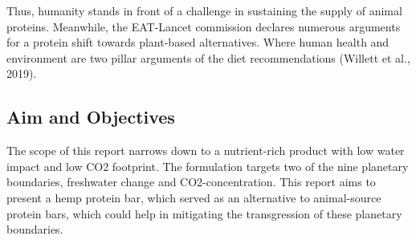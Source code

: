 Thus, humanity stands in front of a challenge in sustaining the supply of animal proteins. Meanwhile, the EAT-Lancet commission declares numerous arguments for a protein shift towards plant-based alternatives. Where human health and environment are two pillar arguments of the diet recommendations (Willett et al., 2019).

\subsection{Aim and Objectives}
The scope of this report narrows down to a nutrient-rich product with low water impact and low CO2  footprint. The formulation targets two of the nine planetary boundaries, freshwater change and CO2-concentration. This report aims to present a hemp protein bar, which served as an alternative to animal-source protein bars, which could help in mitigating the transgression of these planetary boundaries. 

